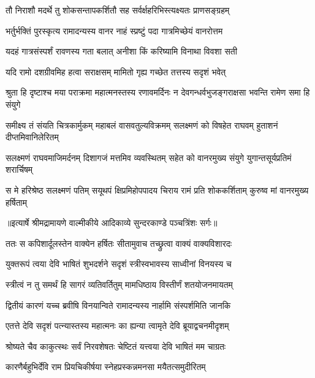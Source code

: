 \twolineshloka
{तौ निराशौ मदर्थे तु शोकसन्तापकर्शितौ}
{सह सर्वर्क्षहरिभिस्त्यक्ष्यतः प्राणसङ्ग्रहम्} %

\twolineshloka
{भर्तुर्भक्तिं पुरस्कृत्य रामादन्यस्य वानर}
{नाहं स्प्रष्टुं पदा गात्रमिच्छेयं वानरोत्तम} %

\twolineshloka
{यदहं गात्रसंस्पर्शं रावणस्य गता बलात्}
{अनीशा किं करिष्यामि विनाथा विवशा सती} %

\twolineshloka
{यदि रामो दशग्रीवमिह हत्वा सराक्षसम्}
{मामितो गृह्य गच्छेत तत्तस्य सदृशं भवेत्} %

\fourlineindentedshloka
{श्रुता हि दृष्टाश्च मया पराक्रमा}
{महात्मनस्तस्य रणावमर्दिनः}
{न देवगन्धर्वभुजङ्गराक्षसा}
{भवन्ति रामेण समा हि संयुगे} %

\fourlineindentedshloka
{समीक्ष्य तं संयति चित्रकार्मुकम्}
{महाबलं वासवतुल्यविक्रमम्}
{सलक्ष्मणं को विषहेत राघवम्}
{हुताशनं दीप्तमिवानिलेरितम्} %

\fourlineindentedshloka
{सलक्ष्मणं राघवमाजिमर्दनम्}
{दिशागजं मत्तमिव व्यवस्थितम्}
{सहेत को वानरमुख्य संयुगे}
{युगान्तसूर्यप्रतिमं शरार्चिषम्} %

\fourlineindentedshloka
{स मे हरिश्रेष्ठ सलक्ष्मणं पतिम्}
{सयूथपं क्षिप्रमिहोपपादय}
{चिराय रामं प्रति शोककर्शिताम्}
{कुरुष्व मां वानरमुख्य हर्षिताम्} %


{॥इत्यार्षे श्रीमद्रामायणे वाल्मीकीये आदिकाव्ये सुन्दरकाण्डे पञ्चत्रिंशः सर्गः॥}


\twolineshloka
{ततः स कपिशार्दूलस्तेन वाक्येन हर्षितः}
{सीतामुवाच तच्छ्रुत्वा वाक्यं वाक्यविशारदः} %

\twolineshloka
{युक्तरूपं त्वया देवि भाषितं शुभदर्शने}
{सदृशं स्त्रीस्वभावस्य साध्वीनां विनयस्य च} %

\twolineshloka
{स्त्रीत्वं न तु समर्थं हि सागरं व्यतिवर्तितुम्}
{मामधिष्ठाय विस्तीर्णं शतयोजनमायतम्} %

\twolineshloka
{द्वितीयं कारणं यच्च ब्रवीषि विनयान्विते}
{रामादन्यस्य नार्हामि संस्पर्शमिति जानकि} %

\twolineshloka
{एतत्ते देवि सदृशं पत्न्यास्तस्य महात्मनः}
{का ह्यन्या त्वामृते देवि ब्रूयाद्वचनमीदृशम्} %

\twolineshloka
{श्रोष्यते चैव काकुत्स्थः सर्वं निरवशेषतः}
{चेष्टितं यत्त्वया देवि भाषितं मम चाग्रतः} %

\twolineshloka
{कारणैर्बहुभिर्देवि राम प्रियचिकीर्षया}
{स्नेहप्रस्कन्नमनसा मयैतत्समुदीरितम्} %

